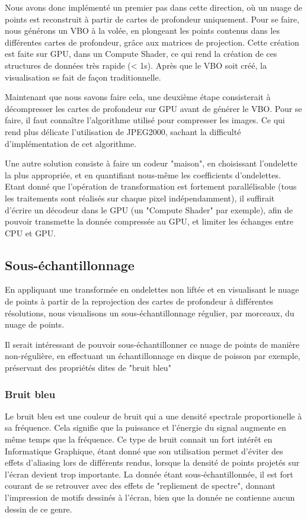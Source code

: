 \documentclass{report}
\begin{document}
Nous avons donc implémenté un premier pas dans cette direction, où un nuage de points est reconstruit à partir de cartes de profondeur uniquement.
Pour se faire, nous générons un VBO à la volée, en plongeant les points contenus dans les différentes cartes de profondeur, grâce aux matrices de projection.
Cette création est faite sur GPU, dans un Compute Shader, ce qui rend la création de ces structures de données très rapide (< 1s).
Après que le VBO soit créé, la visualisation se fait de façon traditionnelle.

Maintenant que nous savons faire cela, une deuxième étape consisterait à décompresser les cartes de profondeur sur GPU avant de générer le VBO.
Pour se faire, il faut connaître l'algorithme utilisé pour compresser les images. Ce qui rend plus délicate l'utilisation de JPEG2000, sachant la difficulté d'implémentation de cet algorithme.

Une autre solution consiste à faire un codeur "maison", en choisissant l'ondelette la plus appropriée, et en quantifiant nous-même les coefficients d'ondelettes.
Etant donné que l'opération de transformation est fortement parallélisable (tous les traitements sont réalisés sur chaque pixel indépendamment), il suffirait d'écrire un décodeur dans le GPU (un "Compute Shader" par exemple), afin de pouvoir transmette la donnée compressée au GPU, et limiter les échanges entre CPU et GPU.

\subsection{Sous-échantillonnage}
\label{subs:sous_echantillonnage}

En appliquant une transformée en ondelettes non liftée et en visualisant le nuage de points à partir de la reprojection des cartes de profondeur à différentes résolutions, nous visualisons un sous-échantillonnage régulier, par morceaux, du nuage de points.

Il serait intéressant de pouvoir sous-échantillonner ce nuage de points de manière non-régulière, en effectuant un échantillonnage en disque de poisson par exemple, préservant des propriétés dites de "bruit bleu"

\subsubsection{Bruit bleu}
\label{subs:Bruit_bleu}

Le bruit bleu est une couleur de bruit qui a une densité spectrale proportionelle à sa fréquence.
Cela signifie que la puissance et l'énergie du signal augmente en même temps que la fréquence.
Ce type de bruit connait un fort intérêt en Informatique Graphique, étant donné que son utilisation permet d'éviter des effets d'aliasing lors de différents rendus, lorsque la densité de points projetés sur l'écran devient trop importante.
La donnée étant sous-échantillonnée, il est fort courant de se retrouver avec des effets de "repliement de spectre", donnant l'impression de motifs dessinés à l'écran, bien que la donnée ne contienne aucun dessin de ce genre.
\end{document}
